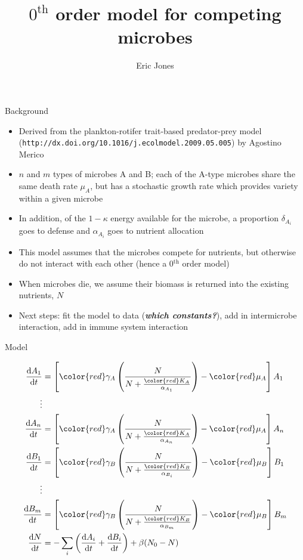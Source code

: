 \documentclass[ignorenonframetext,]{beamer}
\title{\(0^{\text {th}}\) order model for competing microbes}
\author{Eric Jones}
\date{}
\newcommand*\diff{\mathop{}\!\mathrm{d}}
\newcommand*\red{\color{red}}
\begin{document}
\frame{\titlepage}

\begin{frame}{Background}

\begin{itemize}
\itemsep1pt\parskip0pt
\item
  Derived from the plankton-rotifer trait-based predator-prey model
  (\texttt{http://dx.doi.org/10.1016/j.ecolmodel.2009.05.005}) by
  Agostino Merico
\item
  \(n\) and \(m\) types of microbes A and B; each of the A-type microbes
  share the same death rate \(\mu_A\), but has a stochastic growth rate
  which provides variety within a given microbe
\item
  In addition, of the \(1 - \kappa\) energy available for the microbe, a
  proportion \(\delta_{A_i}\) goes to defense and \(\alpha_{A_i}\) goes
  to nutrient allocation
\item
  This model assumes that the microbes compete for nutrients, but
  otherwise do not interact with each other (hence a 0\(^\text{th}\)
  order model)
\item
  When microbes die, we assume their biomass is returned into the
  existing nutrients, \(N\)
\item
  Next steps: fit the model to data (\textbf{\emph{which constants?}}),
  add in intermicrobe interaction, add in immune system interaction
\end{itemize}

\end{frame}

\begin{frame}{Model}

\begin{align*}
    \frac{\diff A_1}{\diff t} &= \left[ {\red \gamma_A} \left(
    \frac{N}{N + \frac{\color{red} K_{A}}{\alpha_{A_1}}}\right) - {\red \mu_A}
    \right]A_1\\ \vdots & \\
    \frac{\diff A_n}{\diff t} &= \left[ {\red \gamma_A} \left( \frac{N}{N +
    \frac{\color{red} K_{A}}{\alpha_{A_n}}}\right) - {\red \mu_A} \right]A_n\\
    \frac{\diff B_1}{\diff t} &= \left[ {\red \gamma_B} \left(
    \frac{N}{N + \frac{\color{red} K_{B}}{\alpha_{B_i}}}\right) - {\red \mu_B}
    \right]B_1\\ \vdots & \\
    \frac{\diff B_m}{\diff t} &= \left[ {\red \gamma_B} \left(
    \frac{N}{N + \frac{\color{red} K_{B}}{\alpha_{B_m}}}\right) - {\red \mu_B}
    \right]B_m\\ \frac{\diff N}{\diff t} &= - \sum_i \left( \frac{\diff
    A_i}{\diff t} + \frac{\diff B_i}{\diff t}  \right) + \beta(N_0 - N)
\end{align*}

\end{frame}
\end{document}
